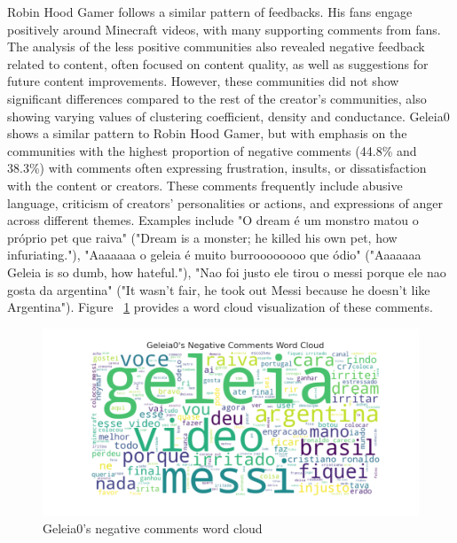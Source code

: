 \documentclass[sigconf]{acmart}
\begin{document}
Robin Hood Gamer follows a similar pattern of feedbacks. His fans engage positively around Minecraft videos, 
with many supporting comments from fans. 
The analysis of the less positive communities also revealed 
negative feedback related to content, often focused on content quality, as well as suggestions for future 
content improvements. However, these communities did not show significant differences compared to the rest of 
the creator's communities, also showing varying values of clustering coefficient, density and conductance.
Geleia0 shows a similar pattern to Robin Hood Gamer, but with emphasis on the communities with the highest proportion of
negative comments (44.8\% and 38.3\%) with comments often expressing frustration, insults, or dissatisfaction with the content 
or creators. These comments frequently include abusive language, criticism of creators' personalities 
or actions, and expressions of anger across different themes. Examples include 
"O dream é um monstro matou o próprio pet que raiva" ("Dream is a monster; he killed his own pet, how infuriating."), 
"Aaaaaaa o geleia é muito burroooooooo que ódio" ("Aaaaaaa Geleia is so dumb, how hateful."), 
"Nao foi justo ele tirou o messi porque ele nao gosta da argentina" ("It wasn't fair, he took out Messi because he doesn't like Argentina").
Figure ~\ref{fig:geleia_comments} provides a word cloud visualization of these comments.  

\begin{figure}[hbt!]
    \centering
    \includegraphics[keepaspectratio,width=\linewidth]{./imgs/geleia/negative_comments.png}
    \caption[width=\textwidth]{Geleia0's negative comments word cloud}
    \label{fig:geleia_comments}
\end{figure}
\end{document}
